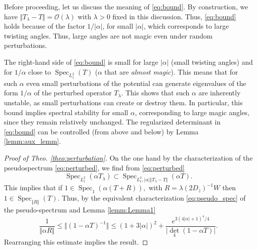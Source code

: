 \documentclass[reqno,12pt,letterpaper]{amsart}
\numberwithin{equation}{section}
\DeclareMathOperator{\Spec}{Spec}
\begin{document}
 Before proceeding, let us discuss the meaning of \eqref{eq:bound}. By construction, we have $\Vert T_{\lambda}-T \Vert = \mathcal O(\lambda)$ with $\lambda>0$ fixed in this discussion. 
 Thus, \eqref{eq:bound} holds because of the factor $1/\vert \alpha \vert$, for small $\vert \alpha\vert$, which corresponds to large twisting angles. Thus, large angles are not magic even under random perturbations. 
 

The right-hand side of \eqref{eq:bound} is small for large $\vert \alpha \vert$ (small twisting angles) and for $1/\alpha$ close to $\Spec_{L^2_{1}}(T)$ ($\alpha$ that are \emph{almost magic}). This means that for such $\alpha$ even small perturbations of the potential can generate eigenvalues of the form $1/\alpha$ of the perturbed operator $T_{\lambda}$. This shows that such $\alpha$ are inherently unstable, as small perturbations can create or destroy them.  In particular, this bound implies spectral stability for small $\alpha$, corresponding to large magic angles, since they remain relatively unchanged. The regularized determinant in \eqref{eq:bound} can be controlled (from above and below) by Lemma \ref{lemm:aux_lemm}.
 \begin{proof}[Proof of Theo. \ref{theo:perturbation}]
 On the one hand by the characterization of the pseudospectrum \eqref{eq:perturbed}, we find from \eqref{eq:perturbed} 
 $$\Spec_{L^2_1}(\alpha T_{\lambda}) \subset \Spec_{L^2_1, \vert \alpha \vert \Vert T_{\lambda}-T \Vert}(\alpha T).$$ This implies that if $1 \in \Spec_1(\alpha (T+R) ) ,$ with $R=\lambda (2D_{\bar z})^{-1}W$ then $1 \in \Spec_{\Vert R \Vert}(T)$. Thus, by the equivalent characterization \eqref{eq:pseudo_spec} of the pseudo-spectrum and Lemma \ref{lemm:Lemma1}
 $$\frac{1}{ \Vert \alpha R \Vert} \le \Vert (1-\alpha T)^{-1} \Vert \le (1+3\vert \alpha \vert)^2+\frac{e^{3(4 \vert \alpha\vert+1)^4/4}}{\vert \operatorname{det}_4(1-\alpha T) \vert}.$$ 
 Rearranging this estimate implies the result.
 \end{proof}
\end{document}
